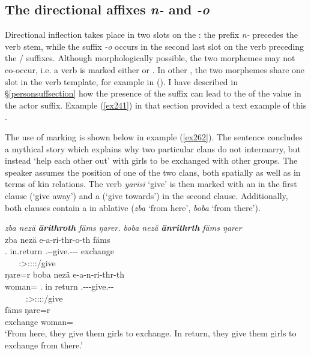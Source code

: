 \subsection{The directional affixes \emph{n-} and \emph{-o}} \label{directionalinflection}

Directional inflection takes place in two slots on the : the  prefix \emph{n-} precedes the verb stem, while the  suffix \emph{-o} occurs in the second last slot on the verb preceding the / suffixes. Although morphologically possible, the two morphemes may not co-occur, i.e. a verb is marked either  or . In other , the two morphemes share one slot in the verb template, for example in  (\citealt{Evans:2015to}). I have described in {\S{}\ref{personsuffsection}} how the presence of the  suffix can lead to the  of the  value in the actor suffix. Example (\ref{ex241}) in that section provided a text example of this .%

The use of  marking is shown below in example (\ref{ex262}). The sentence concludes a mythical story which explains why two particular clans do not intermarry, but instead `help each other out' with girls to be exchanged with other groups. The speaker assumes the position of one of the two clans, both spatially as well as in terms of kin relations. The verb \emph{yarisi} `give' is then marked with an  in the first clause (`give away') and a  (`give towards') in the second clause. Additionally, both clauses contain a  in ablative  (\emph{zba} `from here', \emph{boba} `from there').

\begin{exe}
	\ex \emph{zba nezä \textbf{ärithroth} fäms ŋarer. boba nezä \textbf{änrithrth} fäms ŋarer}\\
	\glll zba nezä e-a-ri-thr-o-th fäms\\
	\Prox.\Abl{} in.return \Stnsg.\Alph-\Vc-give.\Ext-\Ndu-\Andat-\Nsg{} exchange\\
	~ ~ {\Stpl:\Sbj>\Stpl:\Io:\Nonpast:\Ipfv:\Andat/give} ~\\
	\sn
	\glll ŋare=r boba nezä e-a-n-ri-thr-th\\
	woman=\Purp{} \Med.\Abl{} {in return} \Stnsg.\Alph-\Vc-\Venit-give.\Ext-\Ndu-\Stnsg{}\\
	~ ~ ~ {\Stpl:\Sbj>\Stpl:\Io:\Nonpast:\Ipfv:\Venit/give} ~ ~\\
	\sn
	\gll fäms ŋare=r\\
	exchange woman=\Purp{}\\
	\trans `From here, they give them girls to exchange. In return, they give them girls to exchange from there.' 
	\label{ex262}
\end{exe}

